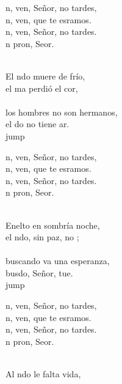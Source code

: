 \begin{cancion}%
	\begin{chorus}%
	n, ven, Señor, no tardes,\\
	n, ven, que te esramos.\\
	n, ven, Señor, no tardes.\\
	n pron, Seor.\\
	\end{chorus}%
	\jump\\
	El ndo muere de frío,\\
	el ma perdió el cor,\\
	\jump\\
los hombres no son hermanos,\\
	el do no tiene ar.\\jump\\
	\begin{chorus}%
	n, ven, Señor, no tardes,\\
	n, ven, que te esramos.\\
	n, ven, Señor, no tardes.\\
	n pron, Seor.\\
	\end{chorus}%
	\jump\\
	Enelto en sombría noche,\\
	el ndo, sin paz, no ;\\
	\jump\\
buscando va una esperanza,\\
	busdo, Señor, tue.\\jump\\
	\begin{chorus}%
	n, ven, Señor, no tardes,\\
	n, ven, que te esramos.\\
	n, ven, Señor, no tardes.\\
	n pron, Seor.\\
	\end{chorus}%
	\jump\\
	Al ndo le falta vida,\\

\end{cancion}
